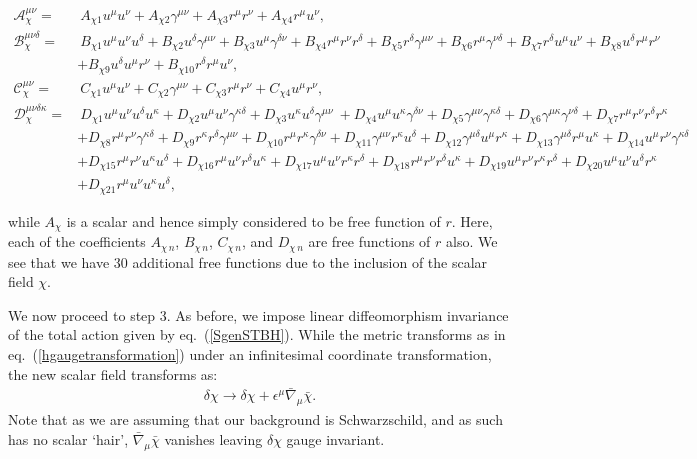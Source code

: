 \documentclass[10pt,twocolumn,preprintnumbers,amsmath,amssymb,nofootinbib
,superscriptaddress]{revtex4-1}
\begin{document}
\begin{widetext}
\begin{align}
 \mathcal{A}_\chi^{\mu\nu}=& \ A_{\chi1}u^\mu u^\nu +A_{\chi2}\gamma^{\mu\nu}+A_{\chi3}r^\mu r^\nu+A_{\chi4}r^\mu u^\nu, \\
 \mathcal{B}_\chi^{\mu\nu\delta}=& \ B_{\chi1}u^\mu u^\nu u^\delta +B_{\chi2}u^\delta\gamma^{\mu\nu}+B_{\chi3}u^\mu\gamma^{\delta\nu}+B_{\chi4}r^\mu r^\nu r^\delta +B_{\chi5} r^\delta \gamma^{\mu\nu}+B_{\chi6}r^\mu \gamma^{\nu\delta}+B_{\chi7}r^\delta u^\mu u^\nu +B_{\chi8}u^\delta r^\mu r^\nu\nonumber\\
 & +B_{\chi9}u^\delta u^\mu r^\nu+B_{\chi10}r^\delta r^\mu u^\nu,\\
 \mathcal{C}_\chi^{\mu\nu}=& \ C_{\chi1}u^\mu u^\nu +C_{\chi2}\gamma^{\mu\nu}+C_{\chi3}r^\mu r^\nu +C_{\chi4} u^\mu r^\nu,\\
 \mathcal{D}_\chi^{\mu\nu\delta\kappa}=&\ D_{\chi1}u^\mu u^\nu u^\delta u^\kappa +D_{\chi2}u^\mu u^\nu \gamma^{\kappa\delta} + D_{\chi3}u^\kappa u^\delta \gamma^{\mu\nu} \ + D_{\chi4} u^\mu u^\kappa \gamma^{\delta\nu} + D_{\chi5}\gamma^{\mu\nu}\gamma^{\kappa\delta} + D_{\chi6}\gamma^{\mu\kappa}\gamma^{\nu\delta}+ D_{\chi7}r^\mu r^\nu r^\delta r^\kappa \nonumber\\
 &+D_{\chi8}r^\mu r^\nu \gamma^{\kappa\delta} + D_{\chi9}r^\kappa r^\delta \gamma^{\mu\nu}+ D_{\chi10} r^\mu r^\kappa \gamma^{\delta\nu}+D_{\chi11}\gamma^{\mu\nu}r^\kappa u^\delta +D_{\chi12}\gamma^{\mu\delta}u^\mu r^\kappa+D_{\chi13}\gamma^{\mu\delta}r^\mu u^\kappa +D_{\chi14}u^\mu r^\nu \gamma^{\kappa\delta}\nonumber \\
 & +D_{\chi15}r^\mu r^\nu u^\kappa u^\delta+D_{\chi16}r^\mu u^\nu r^\delta u^\kappa +D_{\chi17}u^\mu u^\nu r^\kappa r^\delta +D_{\chi18}r^\mu r^\nu r^\delta u^\kappa+D_{\chi19}u^\mu r^\nu r^\kappa r^\delta +D_{\chi20}u^\mu u^\nu u^\delta r^\kappa\nonumber \\
 & +D_{\chi21} r^\mu u^\nu u^\kappa u^\delta,
\end{align}
\end{widetext}
while $A_{\chi}$ is a scalar and hence simply considered to be free function of $r$. Here, each of the coefficients $A_{\chi\,n}$, $B_{\chi\,n}$, $C_{\chi\,n}$, and $D_{\chi\,n}$ are free functions of $r$ also. We see that we have 30 additional free functions due to the inclusion of the scalar field $\chi$. 

We now proceed to step 3. As before, we impose linear diffeomorphism invariance of the total action given by eq.~(\ref{SgenSTBH}). While the metric transforms as in eq.~(\ref{hgaugetransformation}) under an infinitesimal coordinate transformation, the new scalar field transforms as:
\begin{align}
\delta\chi \rightarrow \delta\chi + \epsilon^\mu\bar{\nabla}_\mu \bar{\chi}. \label{scalargaugetransformation}
\end{align}
Note that as we are assuming that our background is Schwarzschild, and as such has no scalar `hair', $\bar{\nabla}_\mu\bar{\chi}$ vanishes leaving $\delta\chi$ gauge invariant. 
\end{document}
